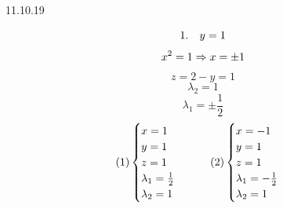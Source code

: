 \documentclass[12pt, fleqn]{article}
\begin{document}
\begin{lect} {11.10.19}
\begin{Task}[3]
            \[1. \quad y = 1\]
            \[x^2 = 1 \Rightarrow x = \pm 1\]
            \[z = 2 - y = 1\]
            \[\lambda_2 = 1\]
            \[\lambda_1 = \pm \frac{1}{2}\]
            \[(1) \begin{cases}
                x = 1\\
                y = 1\\
                z = 1\\
                \lambda_1 = \frac{1}{2}\\
                \lambda_2 = 1
            \end{cases} \qquad (2) \begin{cases}
                x = -1\\
                y = 1\\
                z = 1\\
                \lambda_1 = -\frac{1}{2}\\
                \lambda_2 = 1
            \end{cases}\]


\end{Task}
\end{lect}
\end{document}
